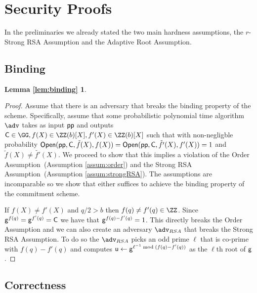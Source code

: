 \clearpage
\section*{\scalebox{1.25}{\appendixphrase}}

\section{Security Proofs}
\label{appendix:hardness}
In the preliminaries we already stated the two main hardness assumptions, the $r$-Strong RSA Assumption and the Adaptive Root Assumption.


\subsection{Binding}
\label{appendix:binding}
\newtheorem*{lemmabinding}{Lemma \ref{lem:binding}}
\begin{lemmabinding}
	\bindinglemma
\end{lemmabinding}
\begin{proof}
    Assume that there is an adversary that breaks the binding property of the scheme. Specifically, assume that some probabilistic polynomial time algorithm $\adv$ takes as input $\textsf{pp}$ and outputs $\gr{C} \in \GG, f(X) \in \ZZ(b)[X], f'(X)\in \ZZ(b)[X]$ such that with non-negligble probability $\textsf{{Open}}(\textsf{pp}, \mathsf{C}, \tilde{f}(X), f(X)) = \textsf{{Open}}(\textsf{pp}, \mathsf{C}, \tilde{f'}(X), f'(X)) = 1$ and $\tilde{f}(X) \neq \tilde{f'}(X)$. We proceed to show that this implies a violation of the Order Assumption~(Assumption \ref{assum:order}) and the Strong RSA Assumption~(Assumption \ref{assum:strongRSA}). The assumptions are incomparable so we show that either suffices to achieve the binding property of the commitment scheme.
    
	If $f(X)\neq f'(X)$ and $q/2>b$ then $f(q)\neq f'(q)\in \ZZ$. Since $\mathsf{g}^{f(q)}=\mathsf{g}^{f'(q)}=\mathsf{C}$ we have that $\mathsf{g}^{f(q)-f'(q)}=1$. This directly breaks the Order Assumption and we can also create an adversary $\adv_{RSA}$ that breaks the Strong RSA Assumption. To do so the $\adv_{RSA}$ picks an odd prime $\ell$ that is co-prime with $f(q)-f'(q)$ and computes $\mathsf{u}\gets \mathsf{g}^{\ell^{-1} \bmod (f(q)-f'(q))}$ as the $\ell$th root of $\mathsf{g}$.
\end{proof}

\subsection{Correctness}
\label{appendix:correctness}

